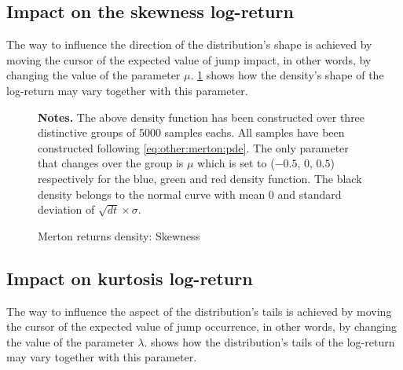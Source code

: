 \documentclass[12pt,a4paper]{report}
\begin{document}
\subsection{Impact on the skewness log-return}
\label{sub:MertonSkewness}

The way to influence the direction of the distribution's shape is achieved by moving the cursor of the expected value of jump impact, in other words, by changing the value of the parameter $\mu$. \cref{plot:MertonReturnDensity} shows how the density's shape of the log-return may vary together with this parameter.


\begin{figure}[h]
\centering

\caption{Merton returns density: Skewness}
  \begin{changemargin}{0.5cm}{0.5cm}
  \medskip
\footnotesize
{}\textbf{Notes.} The above density function has been constructed over three distinctive groups of 5000 samples eachs. All samples have been constructed following \cref{eq:other:merton:pde}. The only parameter that changes over the group is $\mu$ which is set to ($-0.5$, $0$, $0.5$) respectively for the blue, green and red density function. The black density belongs to the normal curve with mean 0 and standard deviation of $\sqrt{dt} \times \sigma$.  
\end{changemargin}
\label{plot:MertonReturnDensity}
\end{figure}

\subsection{Impact on kurtosis log-return}
\label{sub:MertonKurtosis}

The way to influence the aspect of the distribution's tails is achieved by moving the cursor of the expected value of jump occurrence, in other words, by changing the value of the parameter $\lambda$.  shows how the distribution's tails of the log-return may vary together with this parameter.
\end{document}
